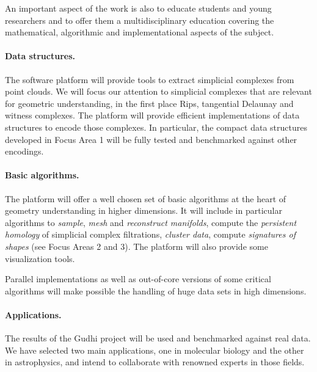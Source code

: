 An important aspect of the work is also to educate students and young
researchers and to offer them a multidisciplinary education covering
the mathematical, algorithmic and implementational aspects of the subject.


\paragraph{Data structures.}
The software platform will provide tools to extract simplicial
complexes from point clouds. We will focus our attention to simplicial
complexes that are relevant for geometric understanding, in the first
place Rips,
tangential Delaunay and witness complexes.  The platform will provide
efficient implementations of data structures to encode those
complexes. In particular, the compact data structures developed in
Focus Area 1 will be fully tested and benchmarked against other
encodings.

\paragraph{Basic algorithms.}
The platform will offer a well chosen set of basic algorithms at the
heart of geometry understanding in higher dimensions. It will include
in particular algorithms to {\em sample}, {\em mesh} and {\em
reconstruct manifolds}, compute the {\em persistent homology} of
simplicial complex filtrations, {\em cluster data}, compute {\em
signatures of shapes} (see Focus Areas 2 and 3). The platform will
also provide some visualization tools.


Parallel implementations as well as out-of-core versions of some
critical algorithms %
will make possible the handling of huge data sets in high dimensions.

\paragraph{Applications.}
The results of the Gudhi project will be used and benchmarked against
real data. We have selected two main applications, one in molecular
biology and the other in astrophysics, and intend to
collaborate with renowned experts in those fields. 



